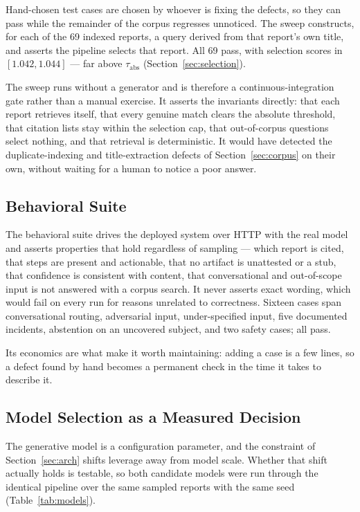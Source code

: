 \documentclass[12pt, a4paper]{article}
\begin{document}
Hand-chosen test cases are chosen by whoever is fixing the defects, so they can pass while the remainder of the corpus regresses unnoticed. The sweep constructs, for each of the 69 indexed reports, a query derived from that report's own title, and asserts the pipeline selects that report. All 69 pass, with selection scores in $[1.042, 1.044]$ --- far above $\tau_{\text{abs}}$ (Section~\ref{sec:selection}).

The sweep runs without a generator and is therefore a continuous-integration gate rather than a manual exercise. It asserts the invariants directly: that each report retrieves itself, that every genuine match clears the absolute threshold, that citation lists stay within the selection cap, that out-of-corpus questions select nothing, and that retrieval is deterministic. It would have detected the duplicate-indexing and title-extraction defects of Section~\ref{sec:corpus} on their own, without waiting for a human to notice a poor answer.

\subsection{Behavioral Suite}

The behavioral suite drives the deployed system over HTTP with the real model and asserts properties that hold regardless of sampling --- which report is cited, that steps are present and actionable, that no artifact is unattested or a stub, that confidence is consistent with content, that conversational and out-of-scope input is not answered with a corpus search. It never asserts exact wording, which would fail on every run for reasons unrelated to correctness. Sixteen cases span conversational routing, adversarial input, under-specified input, five documented incidents, abstention on an uncovered subject, and two safety cases; all pass.

Its economics are what make it worth maintaining: adding a case is a few lines, so a defect found by hand becomes a permanent check in the time it takes to describe it.

\subsection{Model Selection as a Measured Decision}

The generative model is a configuration parameter, and the constraint of Section~\ref{sec:arch} shifts leverage away from model scale. Whether that shift actually holds is testable, so both candidate models were run through the identical pipeline over the same sampled reports with the same seed (Table~\ref{tab:models}).
\end{document}
